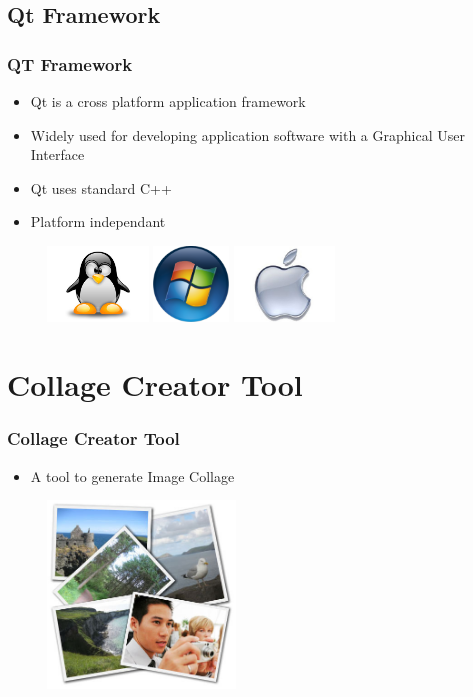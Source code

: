 \documentclass[12pt]{beamer}
\begin{document}
\subsection{Qt Framework}
\begin{frame}
\frametitle{QT Framework}
\begin{itemize}
 \item Qt is a cross platform application framework \pause
 \item Widely used for developing application software with a Graphical User Interface \pause
 \item Qt uses standard C++ \pause
\end{itemize}
\begin{itemize}
 \item Platform independant \pause
\end{itemize}
\begin{figure}
   \includegraphics[height= 2cm]{images/tux.jpg}
   \includegraphics[height= 2cm]{images/windows.png}
    \includegraphics[height= 2cm]{images/mac.jpg}
\end{figure}
\end{frame}


\section{Collage Creator Tool}
\begin{frame}
\frametitle{Collage Creator Tool}
  \begin{itemize}
	\item A tool to generate Image Collage
  \end{itemize} 
\begin{figure}
   \includegraphics[height= 5cm]{images/collage.jpg}
\end{figure}
\end{frame}
\end{document}
